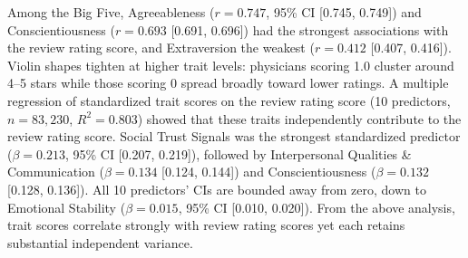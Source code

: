 %
Among the Big Five, Agreeableness ($r = 0.747$, 95\% CI [0.745, 0.749]) and Conscientiousness ($r = 0.693$ [0.691, 0.696]) had the strongest associations with the review rating score, and Extraversion the weakest ($r = 0.412$ [0.407, 0.416]).
%
Violin shapes tighten at higher trait levels: physicians scoring 1.0 cluster around 4--5 stars while those scoring 0 spread broadly toward lower ratings.
%
A multiple regression of standardized trait scores on the review rating score (10 predictors, $n = 83{,}230$, $R^2 = 0.803$) showed that these traits independently contribute to the review rating score.
%
Social Trust Signals was the strongest standardized predictor ($\beta = 0.213$, 95\% CI [0.207, 0.219]), followed by Interpersonal Qualities \& Communication ($\beta = 0.134$ [0.124, 0.144]) and Conscientiousness ($\beta = 0.132$ [0.128, 0.136]).
%
All 10 predictors' CIs are bounded away from zero, down to Emotional Stability ($\beta = 0.015$, 95\% CI [0.010, 0.020]).
%
From the above analysis, trait scores correlate strongly with review rating scores yet each retains substantial independent variance.
%